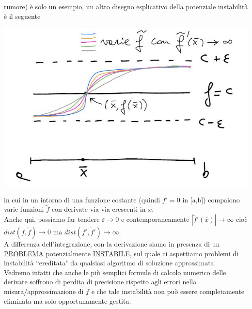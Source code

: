 rumore) è solo un esempio, un altro disegno esplicativo della potenziale instabilità è il seguente 
\begin{center}
    \includegraphics[scale=0.5]{foto/calcolo2_2}
\end{center}
in cui in un intorno di una funzione costante (quindi $f'=0$ in [a,b]) compaiono varie funzioni $\tilde{f}$ con derivate via via crescenti in $\bar{x}$.\\
Anche qui, possiamo far tendere $\varepsilon\rightarrow0$ e contemporaneamente $|\tilde{f}'(\bar{x})|\rightarrow\infty$ cioè $dist(f,\tilde{f})\rightarrow0$ ma $dist(f',\tilde{f}')\rightarrow\infty$.\\A differenza dell'integrazione, con la derivazione siamo in presenza di un \uline{PROBLEMA} potenzialmente \uline{INSTABILE}, sul quale ci aspettiamo problemi di instabilità ``ereditata" da qualsiasi algoritmo di soluzione approssimata.\\Vedremo infatti che anche
le più semplici formule di calcolo numerico delle derivate soffrono di perdita di precisione rispetto agli errori nella misura/approssimazione di $f$ e che tale instabilità non può essere completamente eliminata ma solo opportunamente gestita.

